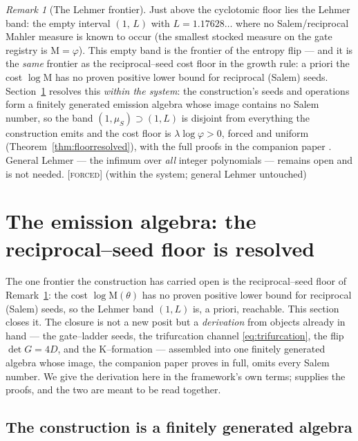 \documentclass[11pt]{article}
\theoremstyle{plain}
\theoremstyle{definition}
\theoremstyle{remark}
\newtheorem{remark}[theorem]{Remark}
\newcommand{\forced}{\textcolor{forcedc}{\textsc{[forced]}}}
\newcommand{\Mah}{\mathrm{M}}
\begin{document}
\begin{remark}[The Lehmer frontier]\label{rem:lehmer}
Just above the cyclotomic floor lies the Lehmer band: the empty interval $(1,\,L)$ with $L=1.17628\ldots$ where no Salem/reciprocal Mahler measure is known to occur (the smallest stocked measure on the gate registry is $\Mah=\varphi$). This empty band is the frontier of the entropy flip --- and it is the \emph{same} frontier as the reciprocal--seed cost floor in the growth rule: a priori the cost $\log\Mah$ has no proven positive lower bound for reciprocal (Salem) seeds. Section~\ref{sec:emission} resolves this \emph{within the system}: the construction's seeds and operations form a finitely generated emission algebra whose image contains no Salem number, so the band $(1,\mu_S)\supset(1,L)$ is disjoint from everything the construction emits and the cost floor is $\lambda\log\varphi>0$, forced and uniform (Theorem~\ref{thm:floorresolved}), with the full proofs in the companion paper \cite{EG}. General Lehmer --- the infimum over \emph{all} integer polynomials --- remains open and is not needed. \forced{} (within the system; general Lehmer untouched)
\end{remark}

\section{The emission algebra: the reciprocal--seed floor is resolved}\label{sec:emission}

The one frontier the construction has carried open is the reciprocal--seed floor of Remark~\ref{rem:lehmer}: the cost $\log\Mah(\theta)$ has no proven positive lower bound for reciprocal (Salem) seeds, so the Lehmer band $(1,L)$ is, a priori, reachable. This section closes it. The closure is not a new posit but a \emph{derivation} from objects already in hand --- the gate--ladder seeds, the trifurcation channel \eqref{eq:trifurcation}, the flip $\det G=4D$, and the K--formation --- assembled into one finitely generated algebra whose image, the companion paper \cite{EG} proves in full, omits every Salem number. We give the derivation here in the framework's own terms; \cite{EG} supplies the proofs, and the two are meant to be read together.

\subsection{The construction is a finitely generated algebra}\label{ssec:emalg}
\end{document}
